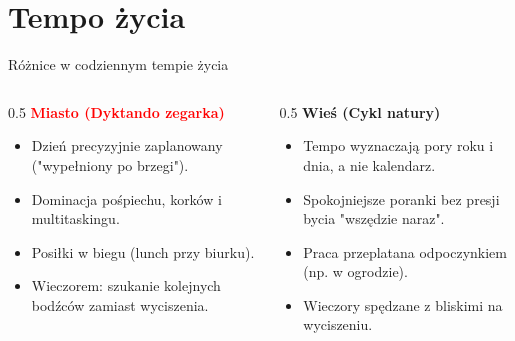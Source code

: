 \section{Tempo życia}
\begin{frame}{Różnice w codziennym tempie życia}
    \begin{columns}
        \begin{column}{0.5\textwidth}
            \textbf{\textcolor{red}{Miasto (Dyktando zegarka)}}
            \begin{itemize}
                \item Dzień precyzyjnie zaplanowany ("wypełniony po brzegi").
                \item Dominacja pośpiechu, korków i multitaskingu.
                \item Posiłki w biegu (lunch przy biurku).
                \item Wieczorem: szukanie kolejnych bodźców zamiast wyciszenia.
            \end{itemize}
        \end{column}

        \begin{column}{0.5\textwidth}
            \textbf{\textcolor{green!60!black}{Wieś (Cykl natury)}}
            \begin{itemize}
                \item Tempo wyznaczają pory roku i dnia, a nie kalendarz.
                \item Spokojniejsze poranki bez presji bycia "wszędzie naraz".
                \item Praca przeplatana odpoczynkiem (np. w ogrodzie).
                \item Wieczory spędzane z bliskimi na wyciszeniu.
            \end{itemize}
        \end{column}
    \end{columns}
\end{frame}